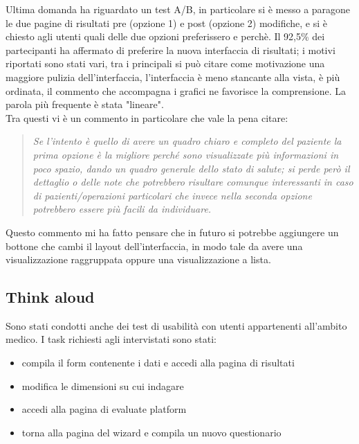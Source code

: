 Ultima domanda ha riguardato un test A/B, in particolare si è messo a paragone le due pagine di risultati pre (opzione 1) e post (opzione 2) modifiche, e si è chiesto agli utenti quali delle due opzioni preferissero e perchè. Il 92,5\% dei partecipanti ha affermato di preferire la nuova interfaccia di risultati; i motivi riportati sono stati vari, tra i principali si può citare come motivazione una maggiore pulizia dell'interfaccia, l'interfaccia è meno stancante alla vista, è più ordinata, il commento che accompagna i grafici ne favorisce la comprensione. La parola più frequente è stata "lineare". \\
Tra questi vi è un commento in particolare che vale la pena citare: 
\begin{quote}
    \textit{Se l'intento è quello di avere un quadro chiaro e completo del paziente la prima opzione è la migliore perché sono visualizzate più informazioni in poco spazio, dando un quadro generale dello stato di salute; si perde però il dettaglio o delle note che potrebbero risultare comunque interessanti in caso di pazienti/operazioni particolari che invece nella seconda opzione potrebbero essere più facili da individuare.}
\end{quote}
Questo commento mi ha fatto pensare che in futuro si potrebbe aggiungere un bottone che cambi il layout dell'interfaccia, in modo tale da avere una visualizzazione raggruppata oppure una visualizzazione a lista.

\subsection{Think aloud}
Sono stati condotti anche dei test di usabilità con utenti appartenenti all'ambito medico.
I task richiesti agli intervistati sono stati:
\begin{itemize}
    \item compila il form contenente i dati e accedi alla pagina di risultati
    \item modifica le dimensioni su cui indagare
    \item accedi alla pagina di evaluate platform
    \item torna alla pagina del wizard e compila un nuovo questionario 
\end{itemize}

